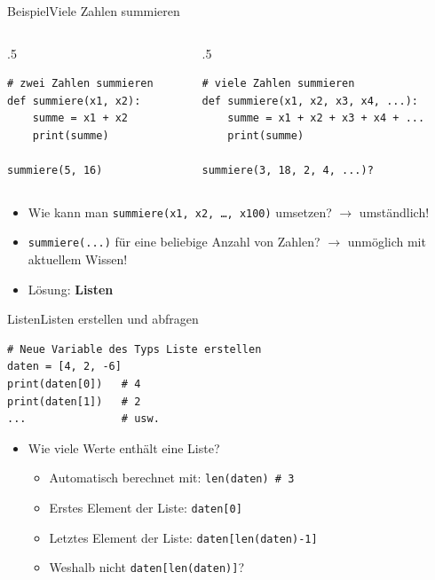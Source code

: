 \begin{frame}[fragile]{Beispiel}{Viele Zahlen summieren}
	\begin{columns}
		\begin{column}{.5\textwidth}
			\begin{lstlisting}[basicstyle=\ttfamily\scriptsize]
# zwei Zahlen summieren
def summiere(x1, x2):
	summe = x1 + x2
	print(summe)

summiere(5, 16)
\end{lstlisting}
		\end{column}

		\begin{column}{.5\textwidth}
			\begin{lstlisting}[basicstyle=\ttfamily\scriptsize]
# viele Zahlen summieren
def summiere(x1, x2, x3, x4, ...):
	summe = x1 + x2 + x3 + x4 + ...
	print(summe)

summiere(3, 18, 2, 4, ...)?
\end{lstlisting}
		\end{column}
	\end{columns}
	\begin{itemize}[<+->]
		\item Wie kann man \lstinline|summiere(x1, x2, …, x100)| umsetzen? $\rightarrow$ umständlich!
		\item \lstinline|summiere(...)| für eine beliebige Anzahl von Zahlen? $\rightarrow$ unmöglich mit aktuellem Wissen!
		\item Lösung: \textbf{Listen}
	\end{itemize}
\end{frame}




\begin{frame}[fragile]{Listen}{Listen erstellen und abfragen}
	\begin{lstlisting}
# Neue Variable des Typs Liste erstellen
daten = [4, 2, -6]
print(daten[0])   # 4
print(daten[1])   # 2
...               # usw.
\end{lstlisting}

	\begin{itemize}[<+->]
		\item Wie viele Werte enthält eine Liste?
		      \begin{itemize}
			      \item Automatisch berechnet mit: \lstinline|len(daten) # 3|
			      \item Erstes Element der Liste: \lstinline|daten[0]|
			      \item Letztes Element der Liste: \lstinline|daten[len(daten)-1]|
			      \item Weshalb nicht \lstinline|daten[len(daten)]|?
		      \end{itemize}
	\end{itemize}
\end{frame}

